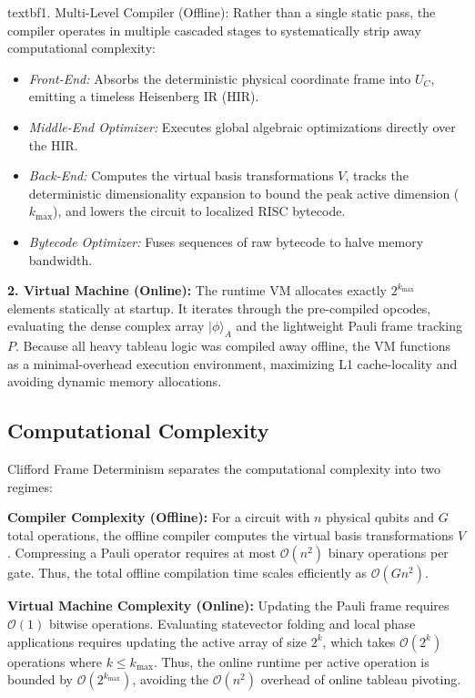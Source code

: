 \documentclass[11pt]{article}
\begin{document}
textbf{1. Multi-Level Compiler (Offline):}
Rather than a single static pass, the compiler operates in multiple cascaded stages to systematically strip away computational complexity:
\begin{itemize}[noitemsep, topsep=2pt]
    \item \textit{Front-End:} Absorbs the deterministic physical coordinate frame into $U_C$, emitting a timeless Heisenberg IR (HIR).
    \item \textit{Middle-End Optimizer:} Executes global algebraic optimizations directly over the HIR.
    \item \textit{Back-End:} Computes the virtual basis transformations $V$, tracks the deterministic dimensionality expansion to bound the peak active dimension ($k_{\max}$), and lowers the circuit to localized RISC bytecode.
    \item \textit{Bytecode Optimizer:} Fuses sequences of raw bytecode to halve memory bandwidth.
\end{itemize}

\textbf{2. Virtual Machine (Online):}
The runtime VM allocates exactly $2^{k_{\max}}$ elements statically at startup. It iterates through the pre-compiled opcodes, evaluating the dense complex array $|\phi\rangle_A$ and the lightweight Pauli frame tracking $P$. Because all heavy tableau logic was compiled away offline, the VM functions as a minimal-overhead execution environment, maximizing L1 cache-locality and avoiding dynamic memory allocations.

\subsection{Computational Complexity}
\label{sec:complexity}

Clifford Frame Determinism separates the computational complexity into two regimes:

\textbf{Compiler Complexity (Offline):} For a circuit with $n$ physical qubits and $G$ total operations, the offline compiler computes the virtual basis transformations $V$. Compressing a Pauli operator requires at most $\mathcal{O}(n^2)$ binary operations per gate. Thus, the total offline compilation time scales efficiently as $\mathcal{O}(G n^2)$.

\textbf{Virtual Machine Complexity (Online):} Updating the Pauli frame requires $\mathcal{O}(1)$ bitwise operations. Evaluating statevector folding and local phase applications requires updating the active array of size $2^k$, which takes $\mathcal{O}(2^k)$ operations where $k \le k_{\max}$. Thus, the online runtime per active operation is bounded by $\mathcal{O}(2^{k_{\max}})$, avoiding the $\mathcal{O}(n^2)$ overhead of online tableau pivoting.
\end{document}
